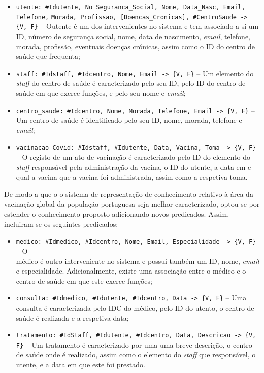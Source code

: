 \documentclass[a4paper, 11pt]{article}
\begin{document}
\begin{itemize}
    \item \texttt{utente:  \#Idutente, No Seguranca\_Social, Nome, Data\_Nasc, Email, Telefone,} \texttt{Morada, Profissao,
    [Doencas\_Cronicas], \#CentroSaude -> \{V, F\}} -- Outente é um dos intervenientes no sistema e tem associado a si um ID,
    número de segurança social, nome, data de nascimento, \textit{email}, telefone, morada, profissão, eventuais doenças
    crónicas, assim como o ID do centro de saúde que frequenta;
    \item \texttt{staff: \#Idstaff, \#Idcentro, Nome, Email -> \{V, F\}} -- Um elemento do \textit{staff} do centro de saúde
    é caracterizado pelo seu ID, pelo ID do centro de saúde em que exerce funções, e pelo seu nome e \textit{email};
    \item \texttt{centro\_saude: \#Idcentro, Nome, Morada, Telefone, Email -> \{V, F\}} -- Um centro de saúde é identificado
    pelo seu ID, nome, morada, telefone e \textit{email};
    \item \texttt{vacinacao\_Covid: \#Idstaff, \#Idutente, Data, Vacina, Toma -> \{V, F\}} -- O registo de um ato de
    vacinação é caracterizado pelo ID do elemento do \textit{staff} responsável pela administração da vacina, o ID do utente,
    a data em e qual a vacina que a vacina foi administrada, assim como a respetiva toma.
\end{itemize}

De modo a que o o sistema de representação de conhecimento relativo à área da vacinação global da população portuguesa
seja melhor caracterizado, optou-se por estender o conhecimento proposto adicionando novos predicados. Assim, incluiram-se
os seguintes predicados:

\begin{itemize}
    \item \texttt{medico: \#Idmedico, \#Idcentro, Nome, Email, Especialidade -> \{V, F\}} -- O \\ médico é outro interveniente
    no sistema e possui também um ID, nome, \textit{email} e especialidade. Adicionalmente, existe uma associação entre o
    médico e o centro de saúde em que este exerce funções;
    \item \texttt{consulta: \#Idmedico, \#Idutente, \#Idcentro, Data -> \{V, F\}} -- Uma consulta é caracterizada pelo IDC
    do médico, pelo ID do utento, o centro de saúde é realizada e a respetiva data;
    \item \texttt{tratamento: \#IdStaff, \#Idutente, \#Idcentro, Data, Descricao -> \{V, F\}} -- Um tratamento é caracterizado
    por uma uma breve descrição, o centro de saúde onde é realizado, assim como o elemento do \textit{staff} que responsável,
    o utente, e a data em que este foi prestado.
\end{itemize}
\end{document}

